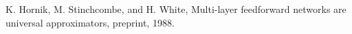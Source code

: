 \begin{thebibliography}{9}
		K. Hornik, M. Stinchcombe, and H. White, Multi-layer feedforward networks are universal approximators, preprint, 1988. 
          
\end{thebibliography}
